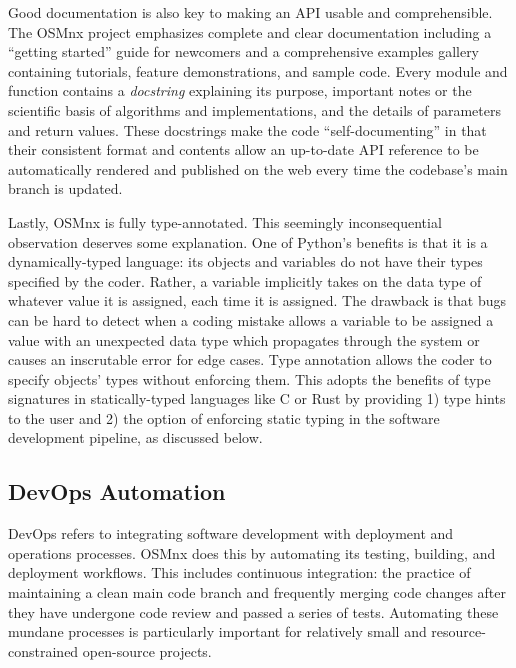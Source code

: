 \documentclass[12pt,letterpaper]{article} %
\begin{document}
Good documentation is also key to making an API usable and comprehensible. The OSMnx project emphasizes complete and clear documentation including a \enquote{getting started} guide for newcomers and a comprehensive examples gallery containing tutorials, feature demonstrations, and sample code. Every module and function contains a \textit{docstring} explaining its purpose, important notes or the scientific basis of algorithms and implementations, and the details of parameters and return values. These docstrings make the code \enquote{self-documenting} in that their consistent format and contents allow an up-to-date API reference to be automatically rendered and published on the web every time the codebase's main branch is updated.

Lastly, OSMnx is fully type-annotated. This seemingly inconsequential observation deserves some explanation. One of Python's benefits is that it is a dynamically-typed language: its objects and variables do not have their types specified by the coder. Rather, a variable implicitly takes on the data type of whatever value it is assigned, each time it is assigned. The drawback is that bugs can be hard to detect when a coding mistake allows a variable to be assigned a value with an unexpected data type which propagates through the system or causes an inscrutable error for edge cases. Type annotation allows the coder to specify objects' types without enforcing them. This adopts the benefits of type signatures in statically-typed languages like C or Rust by providing 1) type hints to the user and 2) the option of enforcing static typing in the software development pipeline, as discussed below.

\subsection{DevOps Automation}

DevOps refers to integrating software development with deployment and operations processes. OSMnx does this by automating its testing, building, and deployment workflows. This includes continuous integration: the practice of maintaining a clean main code branch and frequently merging code changes after they have undergone code review and passed a series of tests. Automating these mundane processes is particularly important for relatively small and resource-constrained open-source projects.
\end{document}
